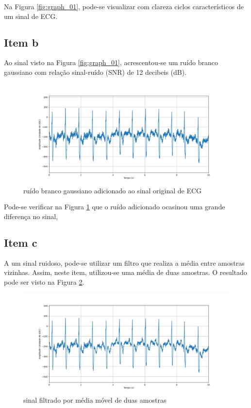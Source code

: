 Na Figura \ref{fig:graph_01}, pode-se visualizar com clareza ciclos característicos de um sinal de ECG.

\subsection{Item b}
Ao sinal visto na Figura \ref{fig:graph_01}, acrescentou-se um ruído branco gaussiano com relação sinal-ruído (SNR) de 12 decibeis (dB).

\begin{figure}[!htb]
    \centering
    \includegraphics[width=\linewidth]{Imagens/fig02.png}
    \caption{ruído branco gaussiano adicionado ao sinal original de ECG}
    \label{fig:graph_02}
\end{figure}

Pode-se verificar na Figura \ref{fig:graph_02} que o ruído adicionado ocasinou uma grande diferença no sinal,

\subsection{Item c}
A um sinal ruidoso, pode-se utilizar um filtro que realiza a média entre amostras vizinhas. Assim, neste item, utilizou-se uma média de duas amostras. O resultado pode ser visto na Figura \ref{fig:graph_03}.

\begin{figure}[!htb]
    \centering
    \includegraphics[width=\linewidth]{Imagens/fig03.png}
    \caption{sinal filtrado por média móvel de duas amostras}
    \label{fig:graph_03}
\end{figure}

